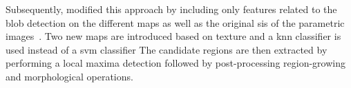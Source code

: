 Subsequently, \citeauthor{Litjens2012} modified this approach by including only features related to the blob detection on the different maps as well as the original \acp{si} of the parametric images~\cite{Litjens2012}.
Two new maps are introduced based on texture and a \ac{knn} classifier is used instead of a \ac{svm} classifier
The candidate regions are then extracted by performing a local maxima detection followed by post-processing region-growing and morphological operations. 

